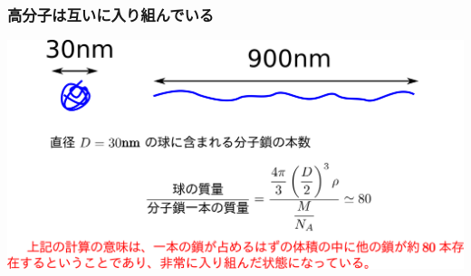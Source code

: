 \documentclass[12pt, dvipdfmx]{beamer}
\begin{document}
\begin{frame}
	\frametitle{高分子は互いに入り組んでいる}
	\centering
	\includegraphics[width=\textwidth]{polymer_penetrate.png}
\end{frame}
\end{document}
